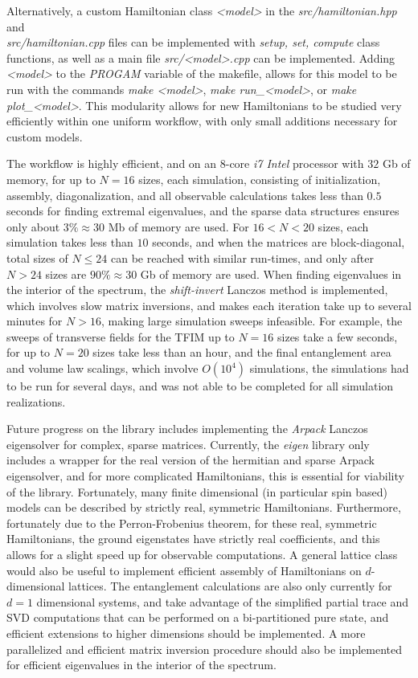 \documentclass[12pt]{article}{}
\begin{document}
Alternatively, a custom Hamiltonian class \emph{<model>} in the \emph{src/hamiltonian.hpp} and \\\emph{src/hamiltonian.cpp} files can be implemented with \emph{setup, set, compute} class functions, as well as a main file \emph{src/<model>.cpp} can be implemented. Adding \emph{<model>} to the \emph{PROGAM} variable of the makefile, allows for this model to be run with the commands \emph{make <model>}, \emph{make run\_<model>}, or \emph{make plot\_<model>}. This modularity allows for new Hamiltonians to be studied very efficiently within one uniform workflow, with only small additions necessary for custom models.

The workflow is highly efficient, and on an $8$-core \emph{i7 Intel} processor with $32$ Gb of memory, for up to $N=16$ sizes, each simulation, consisting of initialization, assembly, diagonalization, and all observable calculations takes less than $0.5$ seconds for finding extremal eigenvalues, and the sparse data structures ensures only about $3\% \approx 30$ Mb of memory are used. For $16 < N < 20$ sizes, each simulation takes less than $10$ seconds, and when the matrices are block-diagonal, total sizes of $N \leq 24$ can be reached with similar run-times, and only after $ N>24$ sizes are $90\% \approx 30$ Gb of memory are used. When finding eigenvalues in the interior of the spectrum, the \emph{shift-invert} Lanczos method is implemented, which involves slow matrix inversions, and makes each iteration take up to several minutes for $N>16$, making large simulation sweeps infeasible. For example, the sweeps of transverse fields for the TFIM up to $N=16$ sizes take a few seconds, for up to $N=20$ sizes take less than an hour, and the final entanglement area and volume law scalings, which involve $O(10^4)$ simulations, the simulations had to be run for several days, and was not able to be completed for all simulation realizations.

Future progress on the library includes implementing the \emph{Arpack} Lanczos eigensolver for complex, sparse matrices. Currently, the \emph{eigen} library only includes a wrapper for the real version of the hermitian and sparse Arpack eigensolver, and for more complicated Hamiltonians, this is essential for viability of the library. Fortunately, many finite dimensional (in particular spin based) models can be described by strictly real, symmetric Hamiltonians. Furthermore, fortunately due to the Perron-Frobenius theorem, for these real, symmetric Hamiltonians, the ground eigenstates have strictly real coefficients, and this allows for a slight speed up for observable computations. A general lattice class would also be useful to implement efficient assembly of Hamiltonians on $d$-dimensional lattices. The entanglement calculations are also only currently for $d=1$ dimensional systems, and take advantage of the simplified partial trace and SVD computations that can be performed on a bi-partitioned pure state, and efficient extensions to higher dimensions should be implemented. A more parallelized and efficient matrix inversion procedure should also be implemented for efficient eigenvalues in the interior of the spectrum.
\end{document}
